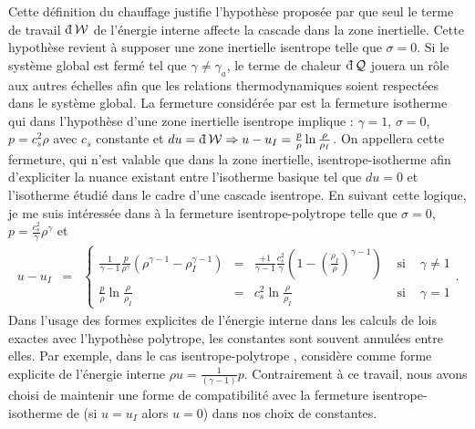 Cette définition du chauffage justifie l'hypothèse proposée par \cite{galtier_exact_2011} que seul le terme de travail $\dj \mathcal{W}$ de l'énergie interne affecte la cascade dans la zone inertielle. Cette hypothèse revient à supposer une zone inertielle isentrope telle que $\sigma = 0$. Si le système global est fermé tel que $\gamma \neq \gamma_a$, le terme de chaleur $\dj \mathcal{Q}$ jouera un rôle aux autres échelles afin que les relations thermodynamiques soient respectées dans le système global. La fermeture considérée par \cite{galtier_exact_2011} est la fermeture isotherme qui dans l'hypothèse d'une zone inertielle isentrope implique :  $\gamma = 1$, $\sigma = 0$, $p = c^2_s \rho$ avec $c_s$ constante et $du = \dj \mathcal{W} \Rightarrow u-u_I = \frac{p}{\rho} \ln \frac{\rho}{\rho_I} $. On appellera cette fermeture, qui n'est valable que dans la zone inertielle, \og isentrope-isotherme \fg{} afin d'expliciter la nuance existant entre l'isotherme basique tel que $du = 0$ et l'isotherme étudié dans le cadre d'une cascade isentrope. En suivant cette logique, je me suis intéressée dans \cite{simon_general_2021} à la fermeture \og isentrope-polytrope \fg{} telle que $\sigma = 0$,  $p = \frac{c_s^2}{\gamma} \rho^{\gamma}$ et 
\begin{eqnarray}
\label{eq:thermo_ipol_u} u - u_I &=& \left\{ \begin{array}{lclcl} \frac{1 }{\gamma-1} \frac{p}{\rho^{\gamma}} \left(\rho^{\gamma-1} - \rho_I^{\gamma-1}\right) &=& \frac{+1 }{\gamma-1} \frac{c_s^2}{\gamma} \left(1 - \left(\frac{\rho_I}{\rho}\right)^{\gamma-1}\right)  & \textrm{ si } & \gamma \neq 1\\
    \frac{p}{\rho} \ln \frac{\rho}{\rho_I} &=&  c_s^2 \ln \frac{\rho}{\rho_I} &\textrm{ si }&  \gamma = 1 
   \end{array} \right. .
\end{eqnarray} 
Dans l'usage des formes explicites de l'énergie interne dans les calculs de lois exactes avec l'hypothèse polytrope, les constantes sont souvent annulées entre elles. Par exemple, dans le cas \og isentrope-polytrope \fg{}, \cite{banerjee_kolmogorov-like_2014} considère comme forme explicite de l'énergie interne $ \rho u = \frac{1}{\left(\gamma-1\right)} p $. Contrairement à ce travail, nous avons choisi de maintenir une forme de compatibilité avec la fermeture \og isentrope-isotherme \fg{} de \cite{galtier_exact_2011} (si $u = u_I$ alors $u = 0$) dans nos choix de constantes.

